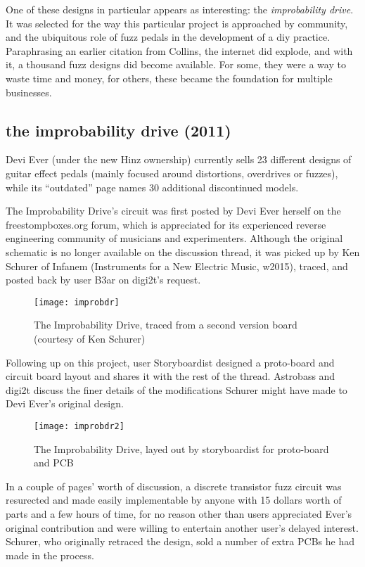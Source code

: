 One of these designs in particular appears as interesting: the \emph{improbability drive}. It was selected for the way this particular project is approached by community, and the ubiquitous role of fuzz pedals in the development of a diy practice. Paraphrasing an earlier citation from Collins, the internet did explode, and with it, a thousand fuzz designs did become available. For some, they were a way to waste time and money, for others, these became the foundation for multiple businesses. 

\subsection{the improbability drive (2011)}

Devi Ever (under the new Hinz ownership) currently sells 23 different designs of guitar effect pedals (mainly focused around distortions, overdrives or fuzzes), while its ``outdated'' page names 30 additional discontinued models. 

The Improbability Drive's circuit was first posted by Devi Ever herself on the freestompboxes.org forum, which is appreciated for its experienced reverse engineering community of musicians and experimenters. Although the original schematic is no longer available on the discussion thread, it was picked up by Ken Schurer of Infanem (Instruments for a New Electric Music, w2015), traced, and posted back by user B3ar on digi2t's request. 

	\begin{figure}[h!]
	  \caption{The Improbability Drive, traced from a second version board (courtesy of Ken Schurer)}
	  \centering
	    \texttt{[image: improbdr]}
	\end{figure}
	
Following up on this project, user Storyboardist designed a proto-board and circuit board layout and shares it with the rest of the thread. Astrobass and digi2t discuss the finer details of the modifications Schurer might have made to Devi Ever's original design. 

	\begin{figure}[h!]
	  \caption{The Improbability Drive, layed out by storyboardist for proto-board and PCB}
	  \centering
	    \texttt{[image: improbdr2]}
	\end{figure}

In a couple of pages' worth of discussion, a discrete transistor fuzz circuit was resurected and made easily implementable by anyone with 15 dollars worth of parts and a few hours of time, for no reason other than users appreciated Ever's original contribution and were willing to entertain another user's delayed interest. Schurer, who originally retraced the design, sold a number of extra PCBs he had made in the process. 

